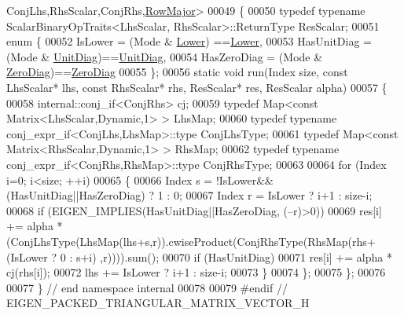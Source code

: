\begin{DoxyCode}
      ConjLhs,RhsScalar,ConjRhs,\hyperlink{group__enums_ggaacded1a18ae58b0f554751f6cdf9eb13acfcde9cd8677c5f7caf6bd603666aae3}{RowMajor}>
00049 \{
00050   \textcolor{keyword}{typedef} \textcolor{keyword}{typename} ScalarBinaryOpTraits<LhsScalar, RhsScalar>::ReturnType ResScalar;
00051   \textcolor{keyword}{enum} \{
00052     IsLower     = (Mode & \hyperlink{group__enums_gga39e3366ff5554d731e7dc8bb642f83cda891792b8ed394f7607ab16dd716f60e6}{Lower})   ==\hyperlink{group__enums_gga39e3366ff5554d731e7dc8bb642f83cda891792b8ed394f7607ab16dd716f60e6}{Lower},
00053     HasUnitDiag = (Mode & \hyperlink{group__enums_gga39e3366ff5554d731e7dc8bb642f83cdaddb72f888ac85d5a1c52333e54f9374b}{UnitDiag})==\hyperlink{group__enums_gga39e3366ff5554d731e7dc8bb642f83cdaddb72f888ac85d5a1c52333e54f9374b}{UnitDiag},
00054     HasZeroDiag = (Mode & \hyperlink{group__enums_gga39e3366ff5554d731e7dc8bb642f83cda884ff7240392e85aa6e4b3c957e36483}{ZeroDiag})==\hyperlink{group__enums_gga39e3366ff5554d731e7dc8bb642f83cda884ff7240392e85aa6e4b3c957e36483}{ZeroDiag}
00055   \};
00056   \textcolor{keyword}{static} \textcolor{keywordtype}{void} run(Index size, \textcolor{keyword}{const} LhsScalar* lhs, \textcolor{keyword}{const} RhsScalar* rhs, ResScalar* res, ResScalar alpha)
00057   \{
00058     internal::conj\_if<ConjRhs> cj;
00059     \textcolor{keyword}{typedef} Map<const Matrix<LhsScalar,Dynamic,1> > LhsMap;
00060     \textcolor{keyword}{typedef} \textcolor{keyword}{typename} conj\_expr\_if<ConjLhs,LhsMap>::type ConjLhsType;
00061     \textcolor{keyword}{typedef} Map<const Matrix<RhsScalar,Dynamic,1> > RhsMap;
00062     \textcolor{keyword}{typedef} \textcolor{keyword}{typename} conj\_expr\_if<ConjRhs,RhsMap>::type ConjRhsType;
00063 
00064     \textcolor{keywordflow}{for} (Index i=0; i<size; ++i)
00065     \{
00066       Index s = !IsLower&&(HasUnitDiag||HasZeroDiag) ? 1 : 0;
00067       Index r = IsLower ? i+1 : size-i;
00068       \textcolor{keywordflow}{if} (EIGEN\_IMPLIES(HasUnitDiag||HasZeroDiag, (--r)>0))
00069     res[i] += alpha * (ConjLhsType(LhsMap(lhs+s,r)).cwiseProduct(ConjRhsType(RhsMap(rhs+(IsLower ? 0 : s+i)
      ,r)))).sum();
00070       \textcolor{keywordflow}{if} (HasUnitDiag)
00071     res[i] += alpha * cj(rhs[i]);
00072       lhs += IsLower ? i+1 : size-i;
00073     \}
00074   \};
00075 \};
00076 
00077 \} \textcolor{comment}{// end namespace internal}
00078 
00079 \textcolor{preprocessor}{#endif // EIGEN\_PACKED\_TRIANGULAR\_MATRIX\_VECTOR\_H}
\end{DoxyCode}
